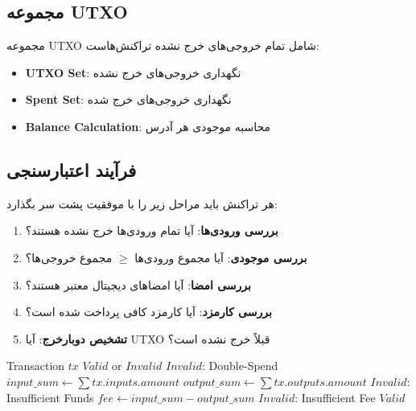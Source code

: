 \subsection{مجموعه UTXO}

مجموعه UTXO  شامل تمام خروجی‌های خرج نشده تراکنش‌هاست:

\begin{itemize}
    \item \textbf{UTXO Set}: نگهداری خروجی‌های خرج نشده
    \item \textbf{Spent Set}: نگهداری خروجی‌های خرج شده
    \item \textbf{Balance Calculation}: محاسبه موجودی هر آدرس
\end{itemize}

\subsection{فرآیند اعتبارسنجی}

هر تراکنش باید مراحل زیر را با موفقیت پشت سر بگذارد:

\begin{enumerate}
    \item \textbf{بررسی ورودی‌ها}: آیا تمام ورودی‌ها خرج نشده هستند؟
    \item \textbf{بررسی موجودی}: آیا مجموع ورودی‌ها $\geq$ مجموع خروجی‌ها؟
    \item \textbf{بررسی امضا}: آیا امضاهای دیجیتال معتبر هستند؟
    \item \textbf{بررسی کارمزد}: آیا کارمزد کافی پرداخت شده است؟
    \item \textbf{تشخیص دوبار‌خرج}: آیا UTXO قبلاً خرج نشده است؟
\end{enumerate}

\begin{latin}
\begin{algorithm}[H]
\caption{Transaction Validation}
\begin{algorithmic}[1]
\REQUIRE Transaction $tx$
\ENSURE $Valid$ or $Invalid$
        \RETURN $Invalid$: Double-Spend
    \ENDIF
\ENDFOR
\STATE $input\_sum \leftarrow \sum tx.inputs.amount$
\STATE $output\_sum \leftarrow \sum tx.outputs.amount$
    \RETURN $Invalid$: Insufficient Funds
\ENDIF
\STATE $fee \leftarrow input\_sum - output\_sum$
    \RETURN $Invalid$: Insufficient Fee
\ENDIF
\RETURN $Valid$
\end{algorithmic}
\end{algorithm}
\end{latin}

